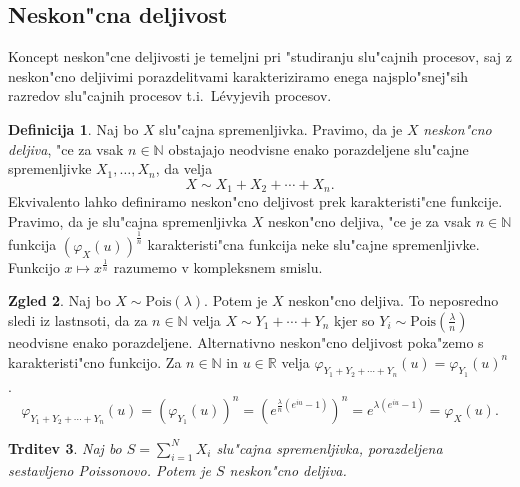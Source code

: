 \documentclass[12pt, a4paper, reqno]{amsart}
\theoremstyle{definition}
\newtheorem{definicija}{Definicija}[section]
\newtheorem{zgled}[definicija]{Zgled}
\theoremstyle{plain}
\newtheorem{trditev}[definicija]{Trditev}
\newcommand{\R}{\mathbb{R}}
\newcommand{\N}{\mathbb{N}}
\newcommand{\1}{\mathds{1}}
\newcommand{\Pois}[1]{\text{Pois}(#1)}
\begin{document}
    \subsection{Neskon"cna deljivost}
        Koncept neskon"cne deljivosti je temeljni pri "studiranju slu"cajnih procesov, saj z neskon"cno 
        deljivimi porazdelitvami karakteriziramo enega najsplo"snej"sih razredov 
        slu"cajnih procesov t.i.\ Lévyjevih procesov.  

    \begin{definicija}
        Naj bo $X$ slu"cajna spremenljivka. Pravimo, da je $X$ \textit{neskon"cno deljiva}, "ce za vsak $n\in\N$
        obstajajo neodvisne enako porazdeljene slu"cajne spremenljivke $X_1, \dots, X_n$, da velja
        \begin{equation*}
            X \sim X_1 + X_2 + \cdots + X_n.
        \end{equation*}
        Ekvivalento lahko definiramo neskon"cno deljivost prek karakteristi"cne funkcije. Pravimo, da je
        slu"cajna spremenljivka $X$ neskon"cno deljiva, "ce je za vsak $n\in\N$ funkcija 
        $\left(\varphi_X(u)\right)^{\frac{1}{n}}$ karakteristi"cna funkcija neke slu"cajne spremenljivke.
        Funkcijo $x\mapsto x^\frac{1}{n}$ razumemo v kompleksnem smislu.
    \end{definicija}

    \begin{zgled}
        Naj bo $X\sim \text{Pois}(\lambda)$. Potem je $X$ neskon"cno deljiva. To neposredno sledi 
        iz lastnsoti, da za $n\in\N$ velja $X\sim Y_1 + \cdots + Y_n$ kjer so $Y_i\sim\Pois{\frac{\lambda}{n}}$ neodvisne 
        enako porazdeljene. Alternativno neskon"cno deljivost poka"zemo s karakteristi"cno
        funkcijo. Za $n\in\N$ in $u\in\R$ velja $\varphi_{Y_1 + Y_2 + \cdots + Y_n}(u) = \varphi_{Y_1}(u)^n$. 
        \begin{equation*}
        \varphi_{Y_1 + Y_2 + \cdots + Y_n}(u) = 
        \left(\varphi_{Y_1}(u)\right)^n = \left(e^{\tfrac{\lambda}{n}(e^{iu} - 1)}\right)^n = e^{\lambda(e^{iu} - 1)} = \varphi_X(u).
        \end{equation*}
    \end{zgled}

    \begin{trditev}
        Naj bo $S = \sum_{i=1}^NX_i$ slu"cajna spremenljivka, porazdeljena sestavljeno Poissonovo.
        Potem je $S$ neskon"cno deljiva.
        \label{trd:CPDneskoncnoDeljiva}
    \end{trditev}
\end{document}
